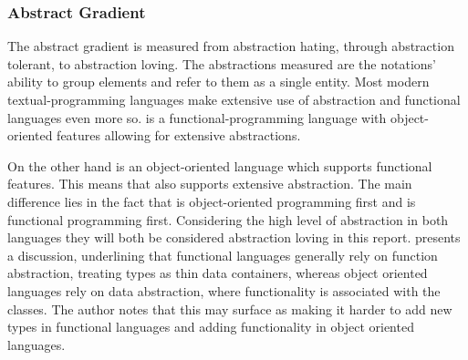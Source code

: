 \subsubsection{Abstract Gradient}
The abstract gradient is measured from abstraction hating, through abstraction tolerant, to abstraction loving. The abstractions measured are the notations' ability to group elements and refer to them as a single entity. Most modern textual-programming languages make extensive use of abstraction and functional languages even more so\cite{hudak1989conception}. \fs is a functional-programming language with object-oriented features allowing for extensive abstractions.

On the other hand \cs is an object-oriented language which supports functional features. This means that \cs also supports extensive abstraction. The main difference lies in the fact that \cs is object-oriented programming first and \fs is functional programming first. %
Considering the high level of abstraction in both languages they will both be considered abstraction loving in this report. \cite{bendersky:abstraction} presents a discussion, underlining that functional languages generally rely on function abstraction, treating types as thin data containers, whereas object oriented languages rely on data abstraction, where functionality is associated with the classes. The author notes that this may surface as making it harder to add new types in functional languages and adding functionality in object oriented languages.

